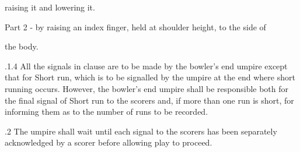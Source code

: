 \documentclass[12pt]{article}
\begin{document}
\vspace{\baselineskip}
\begin{adjustwidth}{2.5in}{0.0in}
{\fontsize{9pt}{10.8pt}\selectfont raising it and lowering it.\par}\par

\end{adjustwidth}


\vspace{\baselineskip}
\begin{adjustwidth}{2.5in}{0.0in}
{\fontsize{9pt}{10.8pt}\selectfont Part 2 - by raising an index finger, held at shoulder height, to the side of\par}\par

\end{adjustwidth}


\vspace{\baselineskip}
\begin{adjustwidth}{2.5in}{0.0in}
{\fontsize{9pt}{10.8pt}\selectfont the body.\par}\par

\end{adjustwidth}


\vspace{\baselineskip}
\begin{adjustwidth}{1.18in}{0.06in}
{\fontsize{9pt}{10.8pt}.1.4 \tabto{1.17in} All the signals in clause are to be made by the bowler’s end umpire except that for Short run, which is to be signalled by the umpire at the end where short running occurs. However, the bowler’s end umpire shall be responsible both for the final signal of Short run to the scorers and, if more than one run is short, for informing them as to the number of runs to be recorded.\par}\par

\end{adjustwidth}


\vspace{\baselineskip}
\begin{adjustwidth}{0.5in}{0.06in}
{\fontsize{9pt}{10.8pt}.2 \tabto{0.49in} The umpire shall wait until each signal to the scorers has been separately acknowledged by a scorer before allowing play to proceed.\par}\par

\end{adjustwidth}
\end{document}
